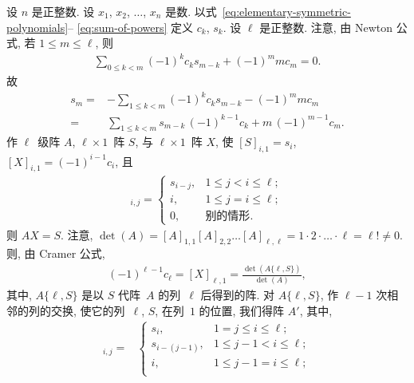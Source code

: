 \documentclass[../libro.tex]{subfiles}
\begin{document}
\begin{example}
    设 \(n\) 是正整数.
    设 \(x_1\), \(x_2\), \(\dots\), \(x_n\) 是数.
    以式~\eqref{eq:elementary-symmetric-polynomials}--%
    \eqref{eq:sum-of-powers}
    定义 \(c_k\), \(s_k\).
    设 \(\ell\) 是正整数.
    注意, 由 Newton 公式,
    若 \(1 \leq m \leq \ell\), 则
    \begin{align*}
        \sum_{0 \leq k < m} {(-1)^k c_k s_{m-k}}
        + (-1)^m m c_m = 0.
    \end{align*}
    故
    \begin{align*}
        s_m
        = {} &
        {-\sum_{1 \leq k < m} {(-1)^k c_k s_{m-k}}
        - (-1)^m m c_m}
        \\
        = {} &
        \sum_{1 \leq k < m} {s_{m-k}\, (-1)^{k-1} c_k}
        + m\, (-1)^{m-1} c_m.
    \end{align*}
    作 \(\ell\)~级阵 \(A\), \(\ell \times 1\)~阵 \(S\),
    与 \(\ell \times 1\)~阵 \(X\),
    使 \([S]_{i,1} = s_i\),
    \([X]_{i,1} = (-1)^{i-1} c_i\),
    且
    \begin{align*}
        [A]_{i,j} =
        \begin{cases}
            s_{i-j}, & 1 \leq j < i \leq \ell; \\
            i,       & 1 \leq j = i \leq \ell; \\
            0,       & \text{别的情形}.
        \end{cases}
    \end{align*}
    则 \(A X = S\).
    注意, \(\det {(A)}
        = [A]_{1,1} [A]_{2,2} \dots [A]_{\ell,\ell}
        = 1 \cdot 2 \cdot \dots \cdot \ell
    = \ell! \neq 0\).
    则, 由 Cramer 公式,
    \begin{align*}
        (-1)^{\ell-1} c_\ell
        = [X]_{\ell,1}
        = \frac{\det {(A\{\ell, S\})}}{\det {(A)}},
    \end{align*}
    其中, \(A\{\ell, S\}\)
    是以 \(S\) 代阵~\(A\) 的列~\(\ell\) 后得到的阵.
    对 \(A\{\ell, S\}\),
    作 \(\ell-1\) 次相邻的列的交换,
    使它的列~\(\ell\), \(S\), 在列~\(1\) 的位置,
    我们得阵 \(A'\),
    其中,
    \begin{align*}
        [A']_{i,j}
        = {} &
        \begin{cases}
            s_i,         & 1 = j \leq i \leq \ell;   \\
            s_{i-(j-1)}, & 1 \leq j-1 < i \leq \ell; \\
            i,           & 1 \leq j-1 = i \leq \ell; \\

\end{cases}
\end{align*}
\end{example}
\end{document}
